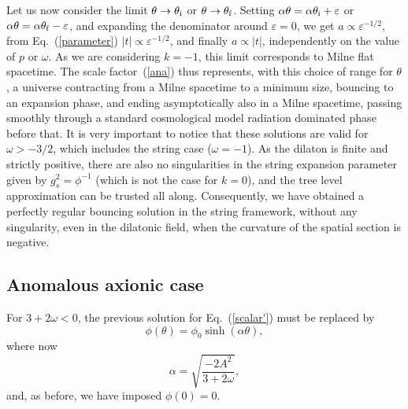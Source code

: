 \documentclass[a4paper,aps,twocolumn,prd,showpacs,nofootinbib]{revtex4}
\begin{document}
Let us now consider the limit $\theta\to\theta_{\rm i}$ or
$\theta\to\theta_{\rm f}$. Setting $\alpha\theta = \alpha\theta_{\rm
i} +\varepsilon$ or $\alpha\theta = \alpha\theta_{\rm f}
-\varepsilon$, and expanding the denominator around $\varepsilon =0$,
we get $a\propto \varepsilon^{-1/2}$, from Eq.~(\ref{parameter})
$|t|\propto \varepsilon^{-1/2}$, and finally $a\propto |t|$,
independently on the value of $p$ or $\omega$.  As we are considering
$k=-1$, this limit corresponds to Milne flat spacetime. The scale
factor~(\ref{ana}) thus represents, with this choice of range for
$\theta$, a universe contracting from a Milne spacetime to a minimum
size, bouncing to an expansion phase, and ending asymptotically also
in a Milne spacetime, passing smoothly through a standard cosmological
model radiation dominated phase before that.  It is very important to
notice that these solutions are valid for $\omega > - 3/2$, which
includes the string case ($\omega = -1$). As the dilaton is finite and
strictly positive, there are also no singularities in the string
expansion parameter given by $g_s^2 = \phi^{-1}$ (which is not the
case for $k=0$), and the tree level approximation can be trusted all
along.  Consequently, we have obtained a perfectly regular bouncing
solution in the string framework, without any singularity, even in the
dilatonic field, when the curvature of the spatial section is
negative.

\subsection{Anomalous axionic case}

For $3 + 2\omega <0$, the previous solution for Eq.~(\ref{scalar'})
must be replaced by
\begin{equation}
\phi(\theta) = \phi_0\sinh (\alpha\theta),\label{phiAA}
\end{equation}
where now
\begin{equation}
\alpha = \sqrt{\frac{-2A^2}{3 + 2\omega}},
\end{equation}
and, as before, we have imposed $\phi(0)=0$.
\end{document}
